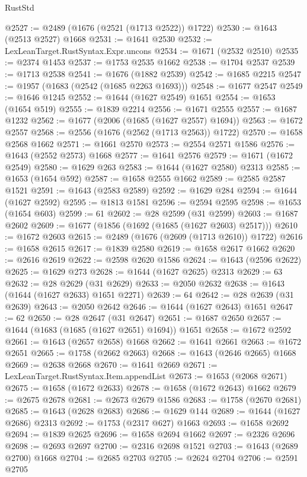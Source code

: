 \begin{lexlean}{RustStd}
\begin{coremodule}
@2527 := @2489 (@1676 (@2521 (@1713 @2522)) @1722)
@2530 := @1643 (@2513 @2527) @1668
@2531 := @1641 @2530
@2532 := LexLeanTarget.RustSyntax.Expr.uncons
@2534 := @1671 (@2532 @2510)
@2535 := @2374 @1453
@2537 := @1753 @2535 @1662
@2538 := @1704 @2537
@2539 := @1713 @2538
@2541 := @1676 (@1882 @2539)
@2542 := @1685 @2215
@2547 := @1957 (@1683 (@2542 (@1685 @2263 @1693)))
@2548 := @1677 @2547
@2549 := @1646 @1245
@2552 := @1644 (@1627 @2549) @1651
@2554 := @1653 (@1654 @519)
@2555 := @1839 @2214
@2556 := @1671 @2555
@2557 := @1687 @1232
@2562 := @1677 (@2006 (@1685 (@1627 @2557) @1694))
@2563 := @1672 @2557
@2568 := @2556 (@1676 (@2562 (@1713 @2563)) @1722)
@2570 := @1658 @2568 @1662
@2571 := @1661 @2570
@2573 := @2554 @2571 @1586
@2576 := @1643 (@2552 @2573) @1668
@2577 := @1641 @2576
@2579 := @1671 (@1672 @2549)
@2580 := @1629 @263
@2583 := @1644 (@1627 @2580) @2313
@2585 := @1653 (@1654 @592)
@2587 := @1658 @2555 @1662
@2589 := @2585 @2587 @1521
@2591 := @1643 (@2583 @2589)
@2592 := @1629 @284
@2594 := @1644 (@1627 @2592)
@2595 := @1813 @1581
@2596 := @2594 @2595
@2598 := @1653 (@1654 @603)
@2599 := 61
@2602 := @28 @2599 (@31 @2599)
@2603 := @1687 @2602
@2609 := @1677 (@1856 (@1692 (@1685 (@1627 @2603) @2517)))
@2610 := @1672 @2603
@2615 := @2489 (@1676 (@2609 (@1713 @2610)) @1722)
@2616 := @1658 @2615
@2617 := @1839 @2580
@2619 := @1658 @2617 @1662
@2620 := @2616 @2619
@2622 := @2598 @2620 @1586
@2624 := @1643 (@2596 @2622)
@2625 := @1629 @273
@2628 := @1644 (@1627 @2625) @2313
@2629 := 63
@2632 := @28 @2629 (@31 @2629)
@2633 := @2050 @2632
@2638 := @1643 (@1644 (@1627 @2633) @1651 @2271)
@2639 := 64
@2642 := @28 @2639 (@31 @2639)
@2643 := @2050 @2642
@2646 := @1644 (@1627 @2643) @1651
@2647 := 62
@2650 := @28 @2647 (@31 @2647)
@2651 := @1687 @2650
@2657 := @1644 (@1683 (@1685 (@1627 @2651) @1694)) @1651
@2658 := @1672 @2592
@2661 := @1643 (@2657 @2658) @1668
@2662 := @1641 @2661
@2663 := @1672 @2651
@2665 := @1758 (@2662 @2663)
@2668 := @1643 (@2646 @2665) @1668
@2669 := @2638 @2668
@2670 := @1641 @2669
@2671 := LexLeanTarget.RustSyntax.Item.appendList
@2673 := @1653 (@2068 @2671)
@2675 := @1658 (@1672 @2633)
@2678 := @1658 (@1672 @2643) @1662
@2679 := @2675 @2678
@2681 := @2673 @2679 @1586
@2683 := @1758 (@2670 @2681)
@2685 := @1643 (@2628 @2683)
@2686 := @1629 @144
@2689 := @1644 (@1627 @2686) @2313
@2692 := @1753 (@2317 @627) @1663
@2693 := @1658 @2692
@2694 := @1839 @2625
@2696 := @1658 @2694 @1662
@2697 := @2326 @2696
@2698 := @2693 @2697
@2700 := @2316 @2698 @1521
@2703 := @1643 (@2689 @2700) @1668
@2704 := @2685 @2703
@2705 := @2624 @2704
@2706 := @2591 @2705

\end{coremodule}
\end{lexlean}
